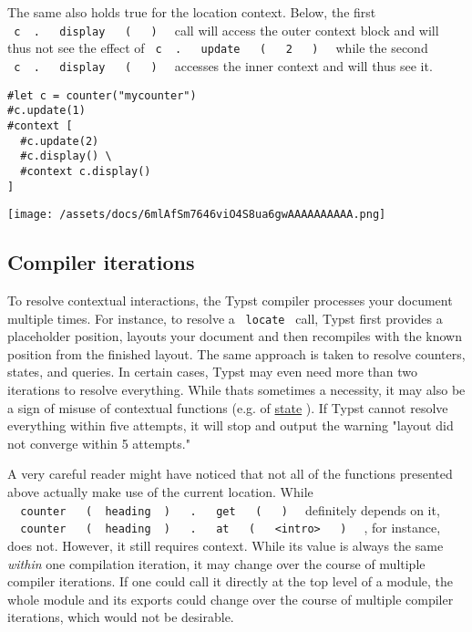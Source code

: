 The same also holds true for the location context. Below, the first
\texttt{\ c\ }{\texttt{\ .\ }}\texttt{\ }{\texttt{\ display\ }}\texttt{\ }{\texttt{\ (\ }}\texttt{\ }{\texttt{\ )\ }}\texttt{\ }
call will access the outer context block and will thus not see the
effect of
\texttt{\ c\ }{\texttt{\ .\ }}\texttt{\ }{\texttt{\ update\ }}\texttt{\ }{\texttt{\ (\ }}\texttt{\ }{\texttt{\ 2\ }}\texttt{\ }{\texttt{\ )\ }}\texttt{\ }
while the second
\texttt{\ c\ }{\texttt{\ .\ }}\texttt{\ }{\texttt{\ display\ }}\texttt{\ }{\texttt{\ (\ }}\texttt{\ }{\texttt{\ )\ }}\texttt{\ }
accesses the inner context and will thus see it.

\begin{verbatim}
#let c = counter("mycounter")
#c.update(1)
#context [
  #c.update(2)
  #c.display() \
  #context c.display()
]
\end{verbatim}

\texttt{[image: /assets/docs/6mlAfSm7646viO4S8ua6gwAAAAAAAAAA.png]}

\subsection{Compiler iterations}\label{compiler-iterations}

To resolve contextual interactions, the Typst compiler processes your
document multiple times. For instance, to resolve a \texttt{\ locate\ }
call, Typst first provides a placeholder position, layouts your document
and then recompiles with the known position from the finished layout.
The same approach is taken to resolve counters, states, and queries. In
certain cases, Typst may even need more than two iterations to resolve
everything. While that\textquotesingle s sometimes a necessity, it may
also be a sign of misuse of contextual functions (e.g. of
\href{/docs/reference/introspection/state/\#caution}{state} ). If Typst
cannot resolve everything within five attempts, it will stop and output
the warning "layout did not converge within 5 attempts."

A very careful reader might have noticed that not all of the functions
presented above actually make use of the current location. While
\texttt{\ }{\texttt{\ counter\ }}\texttt{\ }{\texttt{\ (\ }}\texttt{\ heading\ }{\texttt{\ )\ }}\texttt{\ }{\texttt{\ .\ }}\texttt{\ }{\texttt{\ get\ }}\texttt{\ }{\texttt{\ (\ }}\texttt{\ }{\texttt{\ )\ }}\texttt{\ }
definitely depends on it,
\texttt{\ }{\texttt{\ counter\ }}\texttt{\ }{\texttt{\ (\ }}\texttt{\ heading\ }{\texttt{\ )\ }}\texttt{\ }{\texttt{\ .\ }}\texttt{\ }{\texttt{\ at\ }}\texttt{\ }{\texttt{\ (\ }}\texttt{\ }{\texttt{\ \textless{}intro\textgreater{}\ }}\texttt{\ }{\texttt{\ )\ }}\texttt{\ }
, for instance, does not. However, it still requires context. While its
value is always the same \emph{within} one compilation iteration, it may
change over the course of multiple compiler iterations. If one could
call it directly at the top level of a module, the whole module and its
exports could change over the course of multiple compiler iterations,
which would not be desirable.


